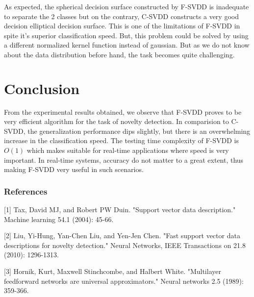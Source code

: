 \documentclass{article} %
\begin{document}
As expected, the spherical decision surface constructed by F-SVDD is inadequate to separate the 2 classes but on the contrary, C-SVDD constructs a very good decision elliptical decision surface. This is one of the limitations of F-SVDD in spite it's superior classification speed. But, this problem could be solved by using a different normalized kernel function instead of gaussian. But as we do not know about the data distribution before hand, the task becomes quite challenging.

\section{Conclusion}
From the experimental results obtained, we observe that F-SVDD proves to be very efficient algorithm for the task of novelty detection. In comparision to C-SVDD, the generalization performance dips slightly, but there is an overwhelming increase in the classification speed. The testing time complexity of F-SVDD is $O(1)$ which makes suitable for real-time applications where speed is very important. In real-time systems, accuracy do not matter to a great extent, thus making F-SVDD very useful in such scenarios.






\subsubsection*{References}

\small{
[1] Tax, David MJ, and Robert PW Duin. "Support vector data description." Machine learning 54.1 (2004): 45-66. 

[2] Liu, Yi-Hung, Yan-Chen Liu, and Yen-Jen Chen. "Fast support vector data descriptions for novelty detection." Neural Networks, IEEE Transactions on 21.8 (2010): 1296-1313.

[3] Hornik, Kurt, Maxwell Stinchcombe, and Halbert White. "Multilayer feedforward networks are universal approximators." Neural networks 2.5 (1989): 359-366.
}
\end{document}
